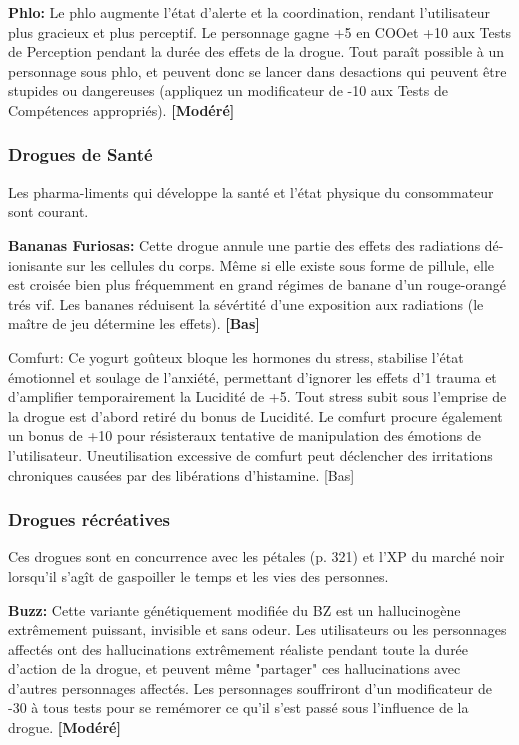 \textbf{Phlo:} Le phlo augmente l'état d'alerte et la coordination, rendant l'utilisateur plus gracieux et plus perceptif. Le personnage gagne +5 en COOet +10 aux Tests de Perception pendant la durée des effets de la drogue. Tout paraît possible à un personnage sous phlo, et peuvent donc se lancer dans desactions qui peuvent être stupides ou dangereuses (appliquez un modificateur de -10 aux Tests de Compétences appropriés). \textbf{[Modéré]} 

\subsubsection{Drogues de Santé} 

Les pharma-liments qui développe la santé et l'état physique du consommateur sont courant. 

\textbf{Bananas Furiosas:} Cette drogue annule une partie des effets des radiations dé-ionisante sur les cellules du corps. Même si elle existe sous forme de pillule, elle est croisée bien plus fréquemment en grand régimes de banane d'un rouge-orangé trés vif. Les bananes réduisent la sévértité d'une exposition aux radiations (le maître de jeu détermine les effets). \textbf{[Bas]} 

Comfurt: Ce yogurt goûteux bloque les hormones du stress, stabilise l'état émotionnel et soulage de l'anxiété, permettant d'ignorer les effets d'1 trauma et d'amplifier temporairement la Lucidité de +5. Tout stress subit sous l'emprise de la drogue est d'abord retiré du bonus de Lucidité. Le comfurt procure également un bonus de +10 pour résisteraux tentative de manipulation des émotions de l'utilisateur. Uneutilisation excessive de comfurt peut déclencher des irritations chroniques causées par des libérations d'histamine. [Bas] 

\subsubsection{Drogues récréatives} 

Ces drogues sont en concurrence avec les pétales (p. 321) et l'XP du marché noir lorsqu'il s'agît de gaspoiller le temps et les vies des personnes. 

\textbf{Buzz:} Cette variante génétiquement modifiée du BZ est un hallucinogène extrêmement puissant, invisible et sans odeur. Les utilisateurs ou les personnages affectés ont des hallucinations extrêmement réaliste pendant toute la durée d'action de la drogue, et peuvent même "partager" ces hallucinations avec d'autres personnages affectés. Les personnages souffriront d'un modificateur de -30 à tous tests pour se remémorer ce qu'il s'est passé sous l'influence de la drogue. \textbf{[Modéré]} 

